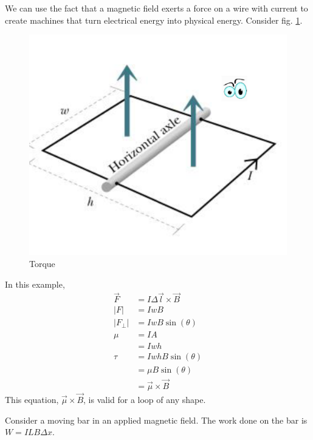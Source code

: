 \documentclass[nobib]{tufte-handout}
\begin{document}
We can use the fact that a magnetic field exerts a force 
on a wire with current to create machines that turn electrical energy into 
physical energy. Consider fig. \ref{fig:magtorque}. 
\begin{figure}
    \center 
    \caption{Torque}
    \label{fig:magtorque}
    \includegraphics{images/Screenshot 2023-11-06 100829.png}
\end{figure}
In this example, 
\begin{align*}
    \vec{F} &= I\Delta \vec{l} \times \vec{B} \\
    |F| &= IwB \\
    |F_{\perp}| &= IwB\sin(\theta) \\
    \mu &= IA \\
    &= Iwh \\
    \tau &= IwhB\sin(\theta) \\
    &= \mu B \sin(\theta) \\
    &= \vec{\mu} \times \vec{B}
\end{align*}
This equation, $\vec{\mu} \times \vec{B}$, is valid for a loop of any shape. 

Consider a moving bar in an applied magnetic field. The work done on the bar 
is $ W= ILB \Delta x$.
\end{document}
